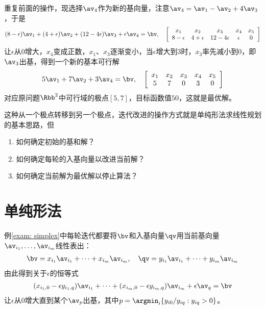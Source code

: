 \documentclass{ctexart}
\begin{document}
\begin{example}
    重复前面的操作，现选择$\av_4$作为新的基向量，注意$\av_4 = \av_1 - \av_2 + 4 \av_3$，于是
    \begin{align*}
        (8 - \epsilon) \av_1 + (4 + \epsilon) \av_2 + (12 - 4 \epsilon) \av_3 + \epsilon \av_4 = \bv, \quad
        \left[ \begin{array}{ccccc}
                       x_1          & x_2          & x_3             & x_4      & x_5 \\
                       8 - \epsilon & 4 + \epsilon & 12 - 4 \epsilon & \epsilon & 0
                   \end{array} \right]
    \end{align*}
    让$\epsilon$从$0$增大，$x_4$变成正数，$x_1$、$x_3$逐渐变小，当$\epsilon$增大到$3$时，$x_3$率先减小到$0$，即$\av_3$出基，得到一个新的基本可行解
    \begin{align*}
        5 \av_1 + 7 \av_2 + 3 \av_4 = \bv, \quad
        \left[ \begin{array}{ccccc}
                       x_1 & x_2 & x_3 & x_4 & x_5 \\
                       5   & 7   & 0   & 3   & 0
                   \end{array} \right]
    \end{align*}
    对应原问题$\Rbb^2$中可行域的极点$[5,7]$，目标函数值$50$，这就是最优解。
\end{example}

\begin{remark}
    这种从一个极点转移到另一个极点，迭代改进的操作方式就是单纯形法求线性规划的基本思路，但
    \begin{enumerate}
        \item 如何确定初始的基和解？
        \item 如何确定每轮的入基向量以改进当前解？
        \item 如何确定当前解为最优解以停止算法？
    \end{enumerate}
\end{remark}

\section{单纯形法}

例\ref{exam: simplex}中每轮迭代都要将$\bv$和入基向量$\qv$用当前基向量$\av_{i_1}, \ldots, \av_{i_m}$线性表出：
\begin{align*}
    \bv = x_{i_1} \av_{i_1} + \cdots + x_{i_m} \av_{i_m}, \quad \qv = y_{i_1} \av_{i_1} + \cdots + y_{i_m} \av_{i_m}
\end{align*}
由此得到关于$\epsilon$的恒等式
\begin{align*}
    (x_{i_1,0} - \epsilon y_{i_1,q}) \av_{i_1} + \cdots + (x_{i_m,0} - \epsilon y_{i_m,q}) \av_{i_m} + \epsilon \av_q = \bv
\end{align*}
让$\epsilon$从$0$增大直到某个$\av_p$出基，其中$p = \argmin_i \{ y_{i0} / y_{iq} : y_{iq} > 0 \}$。
\end{document}
